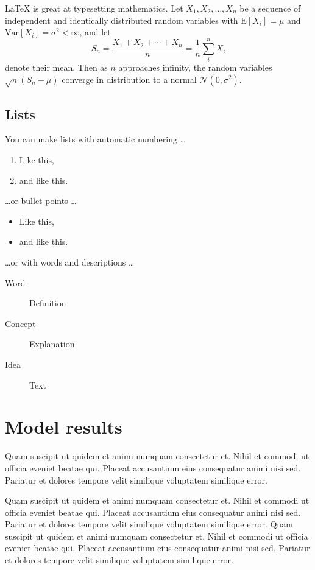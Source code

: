 \documentclass[fleqn,10pt]{physiome}
\begin{document}
\LaTeX{} is great at typesetting mathematics. Let $X_1, X_2, \ldots, X_n$ be a sequence of independent and identically distributed random variables with $\text{E}[X_i] = \mu$ and $\text{Var}[X_i] = \sigma^2 < \infty$, and let
\begin{equation}\label{eq:sum}
S_n = \frac{X_1 + X_2 + \cdots + X_n}{n}
      = \frac{1}{n}\sum_{i}^{n} X_i
\end{equation}
denote their mean. Then as $n$ approaches infinity, the random variables $\sqrt{n}(S_n - \mu)$ converge in distribution to a normal $\mathcal{N}(0, \sigma^2)$.

\subsection{Lists}

You can make lists with automatic numbering \dots

\begin{enumerate}[noitemsep]
\item Like this,
\item and like this.
\end{enumerate}
\dots or bullet points \dots
\begin{itemize}[noitemsep]
\item Like this,
\item and like this.
\end{itemize}
\dots or with words and descriptions \dots
\begin{description}
\item[Word] Definition
\item[Concept] Explanation
\item[Idea] Text
\end{description}

\section{Model results}
Quam suscipit ut quidem et animi numquam consectetur et. Nihil et commodi ut officia eveniet beatae qui. Placeat accusantium eius consequatur animi nisi sed. Pariatur et dolores tempore velit similique voluptatem similique error.

Quam suscipit ut quidem et animi numquam consectetur et. Nihil et commodi ut officia eveniet beatae qui. Placeat accusantium eius consequatur animi nisi sed. Pariatur et dolores tempore velit similique voluptatem similique error. Quam suscipit ut quidem et animi numquam consectetur et. Nihil et commodi ut officia eveniet beatae qui. Placeat accusantium eius consequatur animi nisi sed. Pariatur et dolores tempore velit similique voluptatem similique error.
\end{document}
